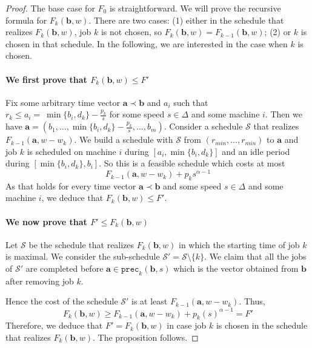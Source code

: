 \documentclass[11pt,a4paper]{article}
\newcommand{\vecteur}[1]{\ensuremath{\mathbf{#1}}}
\newcommand{\precedent}{\texttt{prec}}
\begin{document}
\begin{proof}

The base case for $F_{0}$ is straightforward. We will prove the recursive formula 
for $F_k(\vecteur{b},w)$. There are two cases: (1) either in the schedule
that realizes $F_k(\vecteur{b},w)$, job $k$ is not chosen, so 
$F_k(\vecteur{b},w) = F_{k-1}(\vecteur{b},w)$; 
(2) or $k$ is chosen in that schedule. In the following, we are interested 
in the case when $k$ is chosen.

\paragraph{We first prove that $F_k(\vecteur{b},w)\le F'$}
Fix some arbitrary time vector $\vecteur{a}\prec \vecteur{b}$  and $a_i$ such that
$r_{k} \leq a_i = ~ \min \{ b_{i}, d_{k} \} - \frac{p_k}{s}$ for some 
speed $s\in \Delta$ and some machine $i$.
Then we have $\vecteur{a}=(b_1,\ldots, \min \{ b_{i}, d_{k} \}-\frac{p_k}{s},\ldots,b_m)$.
Consider a schedule $\mathcal{S}$ that realizes $F_{k-1}(\vecteur{a},w-w_k)$.
We build a schedule with $\mathcal{S}$ from $(r_{min},\ldots , r_{min})$ to $\vecteur{a}$ 
and job $k$ is scheduled on machine $i$
during $[a_i,\min \{ b_{i}, d_{k} \}]$ 
and an idle period during $[\min \{ b_{i}, d_{k} \},b_{i}]$. 
So this is a feasible schedule which costs at most 
$$
F_{k-1}(\vecteur{a},w-w_k) + p_k s^{\alpha-1}
$$
As that holds for every time vector $\vecteur{a} \prec \vecteur{b}$
and some speed $s \in \Delta$ and some machine $i$, we deduce that 
$F_k(\vecteur{b},w) \le F'$.


\paragraph{We now prove that $F'\le F_k(\vecteur{b},w)$}
Let $\mathcal{S}$ be the schedule that realizes $F_k(\vecteur{b},w)$ in which
the starting time of job $k$ is maximal.
We consider the sub-schedule $\mathcal{S}'=\mathcal{S}\setminus \{k\}$.
We claim that all the jobs of $\mathcal{S}'$ 
are completed before $\vecteur{a}\in \precedent_k(\vecteur{b},s)$ which
is the vector obtained from $\vecteur{b}$ after removing job $k$.

Hence the cost of the schedule 
$\mathcal{S}'$ is at least $F_{k-1}(\vecteur{a},w-w_k)$. Thus,
$$F_k(\vecteur{b},w) \geq F_{k-1}(\vecteur{a},w-w_k) + p_k(s)^{\alpha-1}  =F'$$
Therefore, we deduce that $F'=F_k(\vecteur{b},w)$ in case job $k$ is chosen in the schedule that realizes $F_k(\vecteur{b},w)$. The proposition follows.
\end{proof}
\end{document}
